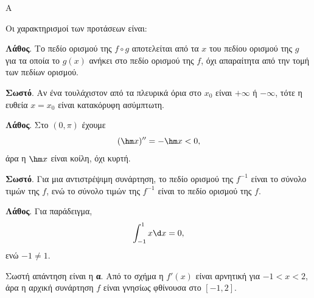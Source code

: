 \begin{thema}{Α}
\begin{erwthma}
\item {}

\item {}

\item {}

\item Οι χαρακτηρισμοί των προτάσεων είναι:
\begin{alist}
\item \textbf{Λάθος}. Το πεδίο ορισμού της $f\circ g$ αποτελείται από τα $x$ του πεδίου ορισμού της $g$ για τα οποία το $g(x)$ ανήκει στο πεδίο ορισμού της $f$, όχι απαραίτητα από την τομή των πεδίων ορισμού.
\item \textbf{Σωστό}. Αν ένα τουλάχιστον από τα πλευρικά όρια στο $x_0$ είναι $+\infty$ ή $-\infty$, τότε η ευθεία $x=x_0$ είναι κατακόρυφη ασύμπτωτη.
\item \textbf{Λάθος}. Στο $(0,\pi)$ έχουμε
\[ (\hm x)''=-\hm x<0, \]
άρα η $\hm x$ είναι κοίλη, όχι κυρτή.
\item \textbf{Σωστό}. Για μια αντιστρέψιμη συνάρτηση, το πεδίο ορισμού της $f^{-1}$ είναι το σύνολο τιμών της $f$, ενώ το σύνολο τιμών της $f^{-1}$ είναι το πεδίο ορισμού της $f$.
\item \textbf{Λάθος}. Για παράδειγμα,
\[ \dint_{-1}^{1}x\d x=0, \]
ενώ $-1\neq1$.
\end{alist}

\item Σωστή απάντηση είναι η \textbf{α}. Από το σχήμα η $f'(x)$ είναι αρνητική για $-1<x<2$, άρα η αρχική συνάρτηση $f$ είναι γνησίως φθίνουσα στο $[-1,2]$.
\end{erwthma}
\end{thema}

